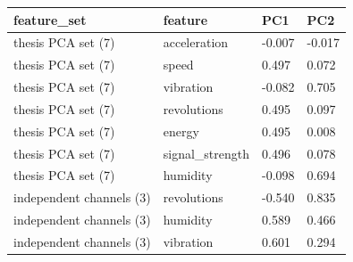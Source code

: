\begin{tabular}{llll}
\toprule
feature\_set & feature & PC1 & PC2 \\
\midrule
thesis PCA set (7) & acceleration & -0.007 & -0.017 \\
thesis PCA set (7) & speed & 0.497 & 0.072 \\
thesis PCA set (7) & vibration & -0.082 & 0.705 \\
thesis PCA set (7) & revolutions & 0.495 & 0.097 \\
thesis PCA set (7) & energy & 0.495 & 0.008 \\
thesis PCA set (7) & signal\_strength & 0.496 & 0.078 \\
thesis PCA set (7) & humidity & -0.098 & 0.694 \\
independent channels (3) & revolutions & -0.540 & 0.835 \\
independent channels (3) & humidity & 0.589 & 0.466 \\
independent channels (3) & vibration & 0.601 & 0.294 \\
\bottomrule
\end{tabular}
